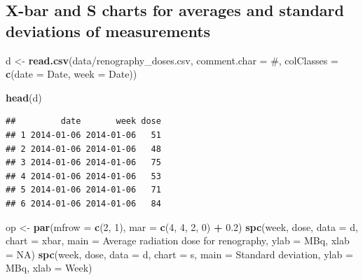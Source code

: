 \documentclass[
]{book}
\newenvironment{Shaded}{\begin{snugshade}}{\end{snugshade}}
\newcommand{\AttributeTok}[1]{\textcolor[rgb]{0.13,0.29,0.53}{#1}}
\newcommand{\ConstantTok}[1]{\textcolor[rgb]{0.56,0.35,0.01}{#1}}
\newcommand{\DecValTok}[1]{\textcolor[rgb]{0.00,0.00,0.81}{#1}}
\newcommand{\FloatTok}[1]{\textcolor[rgb]{0.00,0.00,0.81}{#1}}
\newcommand{\FunctionTok}[1]{\textcolor[rgb]{0.13,0.29,0.53}{\textbf{#1}}}
\newcommand{\NormalTok}[1]{#1}
\newcommand{\OtherTok}[1]{\textcolor[rgb]{0.56,0.35,0.01}{#1}}
\newcommand{\SpecialCharTok}[1]{\textcolor[rgb]{0.81,0.36,0.00}{\textbf{#1}}}
\newcommand{\StringTok}[1]{\textcolor[rgb]{0.31,0.60,0.02}{#1}}
\begin{document}
\subsection{X-bar and S charts for averages and standard deviations of measurements}\label{x-bar-and-s-charts-for-averages-and-standard-deviations-of-measurements}

\begin{Shaded}
\begin{Highlighting}[]
\NormalTok{d }\OtherTok{\textless{}{-}} \FunctionTok{read.csv}\NormalTok{(}\StringTok{\textquotesingle{}data/renography\_doses.csv\textquotesingle{}}\NormalTok{,}
              \AttributeTok{comment.char =} \StringTok{\textquotesingle{}\#\textquotesingle{}}\NormalTok{,}
              \AttributeTok{colClasses   =} \FunctionTok{c}\NormalTok{(}\AttributeTok{date =} \StringTok{\textquotesingle{}Date\textquotesingle{}}\NormalTok{,}
                               \AttributeTok{week =} \StringTok{\textquotesingle{}Date\textquotesingle{}}\NormalTok{))}

\FunctionTok{head}\NormalTok{(d)}
\end{Highlighting}
\end{Shaded}

\begin{verbatim}
##         date       week dose
## 1 2014-01-06 2014-01-06   51
## 2 2014-01-06 2014-01-06   48
## 3 2014-01-06 2014-01-06   75
## 4 2014-01-06 2014-01-06   53
## 5 2014-01-06 2014-01-06   71
## 6 2014-01-06 2014-01-06   84
\end{verbatim}

\begin{Shaded}
\begin{Highlighting}[]
\NormalTok{op }\OtherTok{\textless{}{-}} \FunctionTok{par}\NormalTok{(}\AttributeTok{mfrow =} \FunctionTok{c}\NormalTok{(}\DecValTok{2}\NormalTok{, }\DecValTok{1}\NormalTok{),}
          \AttributeTok{mar   =} \FunctionTok{c}\NormalTok{(}\DecValTok{4}\NormalTok{, }\DecValTok{4}\NormalTok{, }\DecValTok{2}\NormalTok{, }\DecValTok{0}\NormalTok{) }\SpecialCharTok{+} \FloatTok{0.2}\NormalTok{)}
\FunctionTok{spc}\NormalTok{(week, dose,}
    \AttributeTok{data  =}\NormalTok{ d,}
    \AttributeTok{chart =} \StringTok{\textquotesingle{}xbar\textquotesingle{}}\NormalTok{,}
    \AttributeTok{main  =} \StringTok{\textquotesingle{}Average radiation dose for renography\textquotesingle{}}\NormalTok{,}
    \AttributeTok{ylab  =} \StringTok{\textquotesingle{}MBq\textquotesingle{}}\NormalTok{,}
    \AttributeTok{xlab  =} \ConstantTok{NA}\NormalTok{)}
\FunctionTok{spc}\NormalTok{(week, dose,}
    \AttributeTok{data  =}\NormalTok{ d,}
    \AttributeTok{chart =} \StringTok{\textquotesingle{}s\textquotesingle{}}\NormalTok{,}
    \AttributeTok{main  =} \StringTok{\textquotesingle{}Standard deviation\textquotesingle{}}\NormalTok{,}
    \AttributeTok{ylab  =} \StringTok{\textquotesingle{}MBq\textquotesingle{}}\NormalTok{,}
    \AttributeTok{xlab  =} \StringTok{\textquotesingle{}Week\textquotesingle{}}\NormalTok{)}
\end{Highlighting}
\end{Shaded}
\end{document}
